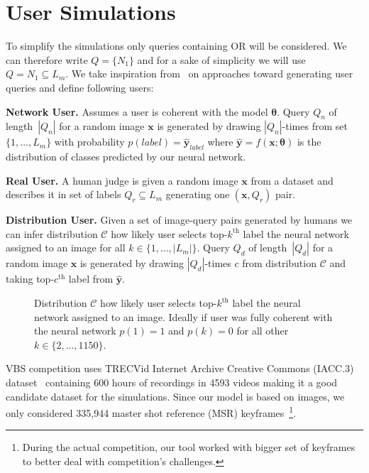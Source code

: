 \section{User Simulations}
To simplify the simulations only queries containing \textsf{OR} will be considered. We can therefore write $Q=\{N_1\}$ and for a sake of simplicity we will use $Q=N_1\subseteq L_m$.
We take inspiration from~\cite{kovalvcik2017comparison} on approaches toward generating user queries and define following users:
\begin{description}[labelwidth=1em, leftmargin=!]
	\item \textbf{Network User.} Assumes a user is coherent with the model $\bm{\theta}$. Query $Q_{n}$ of length~$|Q_{n}|$ for a random image $\bm{x}$ is generated by drawing $|Q_{n}|$-times from set $\{1,\dots,L_m\}$ with probability $p(label)=\bm{\hat{y}}_{label}$ where $\bm{\hat{y}}=f\left(\bm{x}; \bm{\theta}\right)$ is the distribution of classes predicted by our neural network.
	\item \textbf{Real User.} A human judge is given a random image $\bm{x}$ from a dataset and describes it in set of labels $Q_r\subseteq L_m$ generating one $(\bm{x},Q_r)$ pair.
	\item \textbf{Distribution User.} Given a set of image-query pairs generated by humans we can infer distribution $\mathcal{C}$ how likely user selects top-$k^{\mathrm{th}}$ label the neural network assigned to an image for all $k\in\{1,\dots,|L_m|\}$.
	Query $Q_{d}$ of length~$|Q_{d}|$ for a random image $\bm{x}$ is generated by drawing $|Q_{d}|$-times $c$ from distribution $\mathcal{C}$ and taking top-$c^{\mathrm{th}}$ label from $\bm{\hat{y}}$.
\end{description}
\begin{figure}
	\centering
	
	
	\caption[Agreement between user and neural network labeling]{Distribution $\mathcal{C}$ how likely user selects top-$k^{\mathrm{th}}$ label the neural network assigned to an image. Ideally if user was fully coherent with the neural network $p(1)=1$ and $p(k)=0$ for all other $k\in\{2,\dots,1150\}$.
	}
	\label{fig:class_distribution}
\end{figure}
VBS competition uses TRECVid Internet Archive Creative Commons (IACC.3) dataset~\cite{awad2016trecvid} containing 600 hours of recordings in 4593 videos making it a good candidate dataset for the simulations. Since our model is based on images, we only considered 335,944 master shot reference (MSR) keyframes~\cite{MasterShotReference}\footnote{During the actual competition, our tool worked with bigger set of keyframes to better deal with competition's challenges.}.

